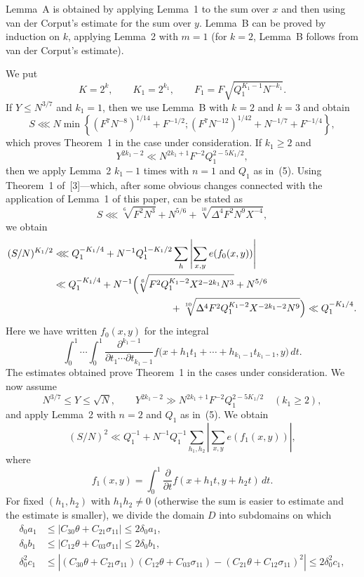 \documentclass[10pt]{article}
\begin{document}
Lemma~A is obtained by applying Lemma~1 to the sum over $x$ and then using van der Corput's estimate for the sum over $y$. Lemma~B can be proved by induction on $k$, applying Lemma~2 with $m=1$ (for $k=2$, Lemma~B follows from van der Corput's estimate).

We put
\[
  K=2^k,\qquad K_1=2^{k_1},\qquad
  F_1=F\sqrt{Q_1^{K_1-1}N^{-k_1}}.
\]
If $Y\leqslant N^{3/7}$ and $k_1=1$, then we use Lemma~B with $k=2$ and $k=3$ and obtain
\[
  S\lll N\min\left\{
    (F^7N^{-8})^{1/14}+F^{-1/2};
    (F^7N^{-12})^{1/42}+N^{-1/7}+F^{-1/4}
  \right\},
\]
which proves Theorem~1 in the case under consideration. If $k_1\geqslant2$ and
\[
  Y^{2k_1-2}\ll N^{2k_1+1}F^{-2}Q_1^{2-5K_1/2},
\]
then we apply Lemma~2 $k_1-1$ times with $n=1$ and $Q_1$ as in~(5). Using Theorem~1 of~[3]---which, after some obvious changes connected with the application of Lemma~1 of this paper, can be stated as
\[
  S\lll \sqrt[6]{F^2N^3}+N^{5/6}
       +\sqrt[10]{\Delta^4F^2N^9X^{-4}},
\]
we obtain
\[
\begin{aligned}
(S/N)^{K_1/2}
&\lll Q_1^{-K_1/4}
 +N^{-1}Q_1^{1-K_1/2}
   \sum_h\left\lvert\sum_{x,y}e(f_0(x,y))\right\rvert\\
&\ll Q_1^{-K_1/4}+N^{-1}\Bigl(
 \sqrt[6]{F^2Q_1^{K_1-2}X^{2-2k_1}N^3}+N^{5/6}\\
&\hspace{42mm}
 +\sqrt[10]{\Delta^4F^2Q_1^{K_1-2}X^{-2k_1-2}N^9}
 \Bigr)
\ll Q_1^{-K_1/4}.
\end{aligned}
\]
Here we have written $f_0(x,y)$ for the integral
\[
  \int_0^1\!\cdots\!\int_0^1
  \frac{\partial^{k_1-1}}{\partial t_1\cdots\partial t_{k_1-1}}
  f\bigl(x+h_1t_1+\cdots+h_{k_1-1}t_{k_1-1},y\bigr)\,dt.
\]
The estimates obtained prove Theorem~1 in the cases under consideration. We now assume
\[
  N^{3/7}\leqslant Y\leqslant\sqrt N,
  \qquad
  Y^{2k_1-2}\gg N^{2k_1+1}F^{-2}Q_1^{2-5K_1/2}
  \quad(k_1\geqslant2),
\]
and apply Lemma~2 with $n=2$ and $Q_1$ as in~(5). We obtain
\[
  (S/N)^2\ll Q_1^{-1}
  +N^{-1}Q_1^{-1}\sum_{h_1,h_2}
   \left\lvert\sum_{x,y}e(f_1(x,y))\right\rvert,
\]
where
\[
  f_1(x,y)=\int_0^1\frac{\partial}{\partial t}
  f(x+h_1t,y+h_2t)\,dt.
\]
For fixed $(h_1,h_2)$ with $h_1h_2\ne0$ (otherwise the sum is easier to estimate and the estimate is smaller), we divide the domain $D$ into subdomains on which
\[
\begin{aligned}
\delta_0a_1&\leqslant\lvert C_{30}\theta+C_{21}\sigma_{11}\rvert
              \leqslant2\delta_0a_1,\\
\delta_0b_1&\leqslant\lvert C_{12}\theta+C_{03}\sigma_{11}\rvert
              \leqslant2\delta_0b_1,\\
\delta_0^2c_1&\leqslant
 \left\lvert
 (C_{30}\theta+C_{21}\sigma_{11})(C_{12}\theta+C_{03}\sigma_{11})
 -(C_{21}\theta+C_{12}\sigma_{11})^2
 \right\rvert
 \leqslant2\delta_0^2c_1,
\end{aligned}
\]
\end{document}
